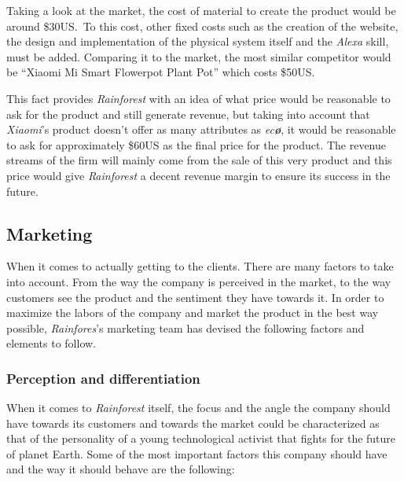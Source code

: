 \documentclass[english,runningheads,a4paper]{llncs}[2018/03/10]
\begin{document}
        Taking a look at the market, the cost of material to create the product
        would be around \$30US.\ To this cost, other fixed costs such as the
        creation of the website, the design and implementation of the physical
        system itself and the \textit{Alexa} skill, must be added. Comparing it
        to the market, the most similar competitor would be ``Xiaomi Mi Smart
        Flowerpot Plant Pot'' which costs \$50US.\

        This fact provides \textit{Rainforest} with an idea of what price would
        be reasonable to ask for the product and still generate revenue, but
        taking into account that \textit{Xiaomi}'s product doesn't offer as many
        attributes as \textit{ec\textbf{\o}}, it would be reasonable to ask for
        approximately \$60US as the final price for the product. The revenue
        streams of the firm will mainly come from the sale of this very product
        and this price would give \textit{Rainforest} a decent revenue margin to
        ensure its success in the future.


    \subsection*{Marketing}

    When it comes to actually getting to the clients. There are many factors to
    take into account. From the way the company is perceived in the market, to
    the way customers see the product and the sentiment they have towards it. In
    order to maximize the labors of the company and market the product in the
    best way possible, \textit{Rainfores}'s marketing team has devised the
    following factors and elements to follow.


        \subsubsection*{Perception and differentiation}

        When it comes to \textit{Rainforest} itself, the focus and the angle the
        company should have towards its customers and towards the market could
        be characterized as that of the personality of a young technological
        activist that fights for the future of planet Earth. Some of the most
        important factors this company should have and the way it should behave
        are the following:
\end{document}
